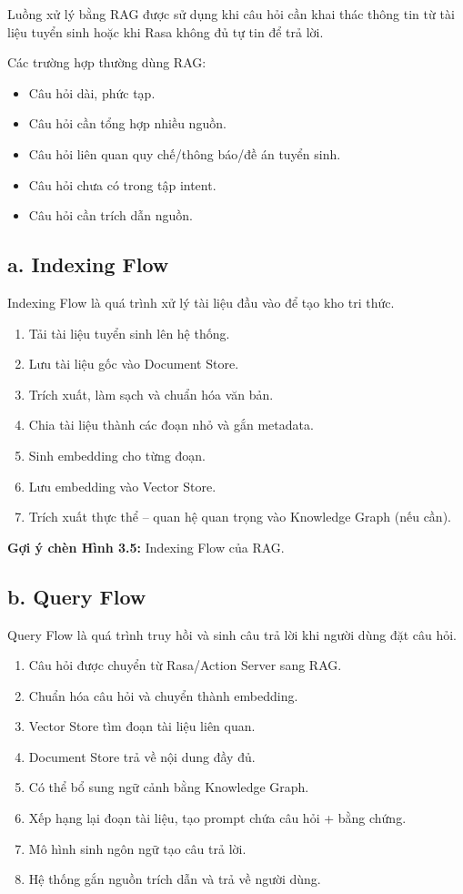 \documentclass[12pt,a4paper]{report}
\begin{document}
Luồng xử lý bằng RAG được sử dụng khi câu hỏi cần khai thác thông tin từ tài liệu tuyển sinh hoặc khi Rasa không đủ tự tin để trả lời.

Các trường hợp thường dùng RAG:
\begin{itemize}
    \item Câu hỏi dài, phức tạp.
    \item Câu hỏi cần tổng hợp nhiều nguồn.
    \item Câu hỏi liên quan quy chế/thông báo/đề án tuyển sinh.
    \item Câu hỏi chưa có trong tập intent.
    \item Câu hỏi cần trích dẫn nguồn.
\end{itemize}

\subsection*{a. Indexing Flow}

Indexing Flow là quá trình xử lý tài liệu đầu vào để tạo kho tri thức.
\begin{enumerate}
    \item Tải tài liệu tuyển sinh lên hệ thống.
    \item Lưu tài liệu gốc vào Document Store.
    \item Trích xuất, làm sạch và chuẩn hóa văn bản.
    \item Chia tài liệu thành các đoạn nhỏ và gắn metadata.
    \item Sinh embedding cho từng đoạn.
    \item Lưu embedding vào Vector Store.
    \item Trích xuất thực thể -- quan hệ quan trọng vào Knowledge Graph (nếu cần).
\end{enumerate}

\textbf{Gợi ý chèn Hình 3.5:} Indexing Flow của RAG.

\subsection*{b. Query Flow}

Query Flow là quá trình truy hồi và sinh câu trả lời khi người dùng đặt câu hỏi.
\begin{enumerate}
    \item Câu hỏi được chuyển từ Rasa/Action Server sang RAG.
    \item Chuẩn hóa câu hỏi và chuyển thành embedding.
    \item Vector Store tìm đoạn tài liệu liên quan.
    \item Document Store trả về nội dung đầy đủ.
    \item Có thể bổ sung ngữ cảnh bằng Knowledge Graph.
    \item Xếp hạng lại đoạn tài liệu, tạo prompt chứa câu hỏi + bằng chứng.
    \item Mô hình sinh ngôn ngữ tạo câu trả lời.
    \item Hệ thống gắn nguồn trích dẫn và trả về người dùng.
\end{enumerate}
\end{document}
